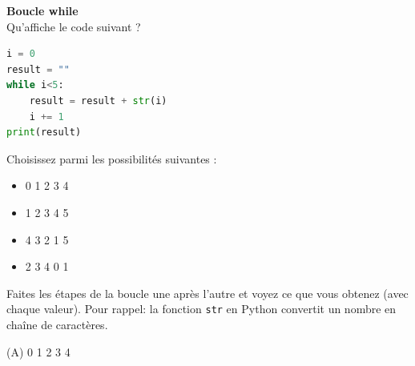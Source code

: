    
    \begin{Exercice}[5 minutes] [Python] \textbf{Boucle while}\\
      	Qu'affiche le code suivant ?
      	
      	\begin{lstlisting}[language=Python]
i = 0
result = ""
while i<5:
    result = result + str(i)
    i += 1
print(result)
        		 \end{lstlisting}
             	
        Choisissez parmi les possibilités suivantes :
        
        \begin{itemize}
        
        \item[(A)] 0 
        1 
        2 
        3 
        4 
        \item[(B)] 1  
        2 
        3 
        4 
        5 
        \item[(C)] 4 
        3 
        2 
        1 
        5 
        \item[(D)] 2 
        3 
        4 
        0 
        1
        \end{itemize}
    
        \begin{conseil}
		   Faites les étapes de la boucle une après l'autre et voyez ce que vous obtenez (avec chaque valeur).  Pour rappel: la fonction \texttt{str} en Python convertit un nombre en chaîne de caractères.
        \end{conseil}
        
        \begin{solution}
         (A)   0 
            1 
            2 
            3 
            4
        \end{solution}
    \end{Exercice}
    
